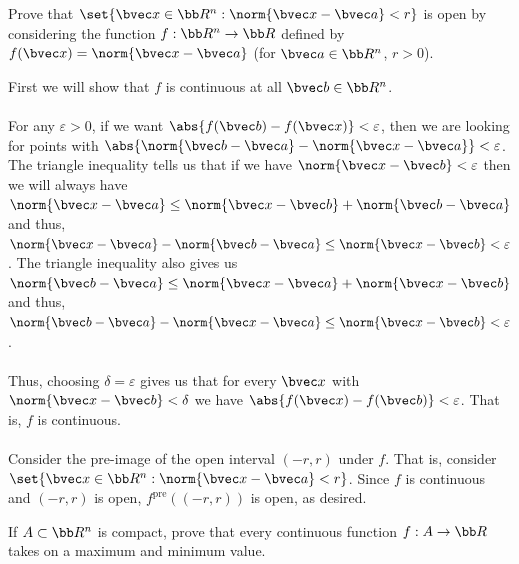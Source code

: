\documentclass[12pt, letterpaper]{hmcpset}
\begin{document}
\pagebreak

\begin{problem}[27]
	Prove that $\set{\bvec x \in \bb R^n : \norm{\bvec x - \bvec a} < r}$ is open by considering the function $f : \bb R^n \to \bb R$ defined by $f(\bvec x) = \norm{\bvec x - \bvec a}$ (for $\bvec a \in \bb R^n$, $r > 0$).
\end{problem}

\begin{solution}
	First we will show that $f$ is continuous at all $\bvec b \in \bb R^n$.\\\\
	For any $\varepsilon > 0$, if we want $\abs{f(\bvec b) - f(\bvec x)} < \varepsilon$, then we are looking for points with $\abs{\norm{\bvec b - \bvec a} - \norm{\bvec x - \bvec a}} < \varepsilon$. The triangle inequality tells us that if we have $\norm{\bvec x - \bvec b} < \varepsilon$ then we will always have $\norm{\bvec x - \bvec a} \le \norm{\bvec x - \bvec b} + \norm{\bvec b - \bvec a}$ and thus, $\norm{\bvec x - \bvec a} - \norm{\bvec b - \bvec a} \le \norm{\bvec x - \bvec b} < \varepsilon$. The triangle inequality also gives us $\norm{\bvec b - \bvec a} \le \norm{\bvec x - \bvec a} + \norm{\bvec x - \bvec b}$ and thus, $\norm{\bvec b - \bvec a} - \norm{\bvec x - \bvec a} \le \norm{\bvec x - \bvec b} < \varepsilon$. \\\\
	Thus, choosing $\delta = \varepsilon$ gives us that for every $\bvec x$ with $\norm{\bvec x - \bvec b} < \delta$ we have $\abs{f(\bvec x) - f(\bvec b)} < \varepsilon$. That is, $f$ is continuous.\\\\
	Consider the pre-image of the open interval $(-r, r)$ under $f$. That is, consider $\set{\bvec x \in \bb R^n : \norm{\bvec x - \bvec a} <r}$. Since $f$ is continuous and $(-r, r)$ is open, $f^\text{pre}((-r, r))$ is open, as desired.
\end{solution}

\pagebreak

\begin{problem}[29]
	If $A \subset \bb R^n$ is compact, prove that every continuous function $f : A \to \bb R$ takes on a maximum and minimum value.
\end{problem}
\end{document}
